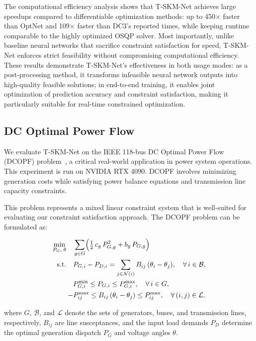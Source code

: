 \documentclass[letterpaper]{article} %
\begin{document}
The computational efficiency analysis shows that T-SKM-Net achieves large speedups compared to differentiable optimization methods: up to 450$\times$ faster than OptNet and 109$\times$ faster than DC3’s reported times, while keeping runtime comparable to the highly optimized OSQP solver. Most importantly, unlike baseline neural networks that sacrifice constraint satisfaction for speed, T-SKM-Net enforces strict feasibility without compromising computational efficiency. These results demonstrate T-SKM-Net’s effectiveness in both usage modes: as a post-processing method, it transforms infeasible neural network outputs into high-quality feasible solutions; in end-to-end training, it enables joint optimization of prediction accuracy and constraint satisfaction, making it particularly suitable for real-time constrained optimization.

\subsection{DC Optimal Power Flow}

We evaluate T-SKM-Net on the IEEE 118-bus DC Optimal Power Flow (DCOPF) problem~\cite{houLinearizedModelActive2018,anderson2022real}, a critical real-world application in power system operations. This experiment is run on NVIDIA RTX 4090. DCOPF involves minimizing generation costs while satisfying power balance equations and transmission line capacity constraints.

This problem represents a mixed linear constraint system that is well-suited for evaluating our constraint satisfaction approach. The DCOPF problem can be formulated as:

\begin{align}
\min_{P_G,\;\theta}\quad 
& \sum_{g\in G}\Bigl(\tfrac12\,c_g\,P_{G,g}^2 + b_g\,P_{G,g}\Bigr) \\
\text{s.t.}\quad
& P_{G,i} - P_{D,i}
  = \sum_{j\in \mathcal{N}(i)} B_{ij}\,(\theta_i - \theta_j),
  \quad \forall\,i\in \mathcal{B}, \notag\\
& P_{G,i}^{\min} \le P_{G,i} \le P_{G,i}^{\max},
  \quad \forall\,i\in G, \notag\\
-&P_{ij}^{\max} \le B_{ij}\,(\theta_i - \theta_j) \le P_{ij}^{\max},
  \quad \forall\,(i,j)\in \mathcal{L}. \notag
\end{align}

where $G$, $\mathcal{B}$, and $\mathcal{L}$ denote the sets of generators, buses, and transmission lines, respectively, $B_{ij}$ are line susceptances, and the input load demands $P_D$ determine the optimal generation dispatch $P_G$ and voltage angles $\theta$.
\end{document}

